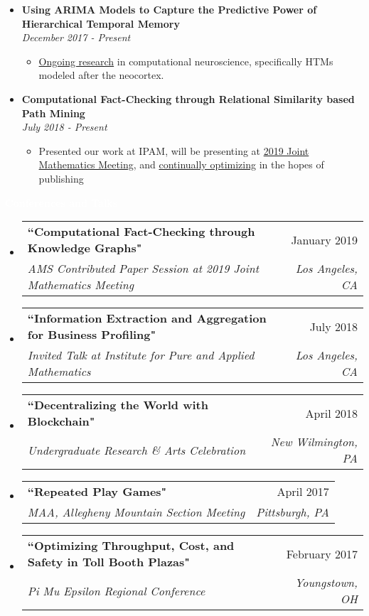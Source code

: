 \documentclass[letterpaper,11pt]{article}
\makeatletter
\newcommand{\resitem}[1]{\item #1 \vspace{-2pt}}
\newcommand{\resheading}[1]{{\large \colorbox{electricpurple}{\begin{minipage}{\textwidth}{\textbf{#1 \vphantom{p\^{E}}}}\end{minipage}}}}
\newcommand{\ressubheading}[4]{
	\begin{tabular*}{7.0in}{l@{\extracolsep{\fill}}r}
		\textbf{#1} & #2 \\
		\textit{#3} & \textit{#4} \\
	\end{tabular*}\vspace{-6pt}}
\makeatother
\begin{document}
		\begin{itemize}[topsep=3pt, itemsep=1pt]
			\item \textbf{Using ARIMA Models to Capture the Predictive Power of Hierarchical Temporal Memory} \\ \textit{December 2017 - Present}
			\begin{itemize}[topsep=1pt, itemsep=1pt]
				\resitem{\href{https://github.com/alexandermichels/HonorsResearch}{Ongoing research} in computational neuroscience, specifically HTMs modeled after the neocortex.}
			\end{itemize}
			
			\item \textbf{Computational Fact-Checking through Relational Similarity based Path Mining} \\	\textit{July 2018 - Present}
			\begin{itemize}[topsep=1pt, itemsep=1pt]
				\resitem{Presented our work at IPAM, will be presenting at \href{https://jointmathematicsmeetings.org/meetings/national/jmm2019/2217_progfull.html?fbclid=IwAR0AccnUi\_yuX4UdnTVF-cCFVJ5lNYAdIvzw7TPS81eGXk1pn5PvQjaGyTo\#2217:AMSCP33}{2019 Joint Mathematics Meeting}, and \href{https://github.com/himahuja/StreamMiner}{continually optimizing} in the hopes of publishing}
			\end{itemize}
		\end{itemize}
	
		\resheading{\textcolor{white}{Conferences and Talks}}
		
		\begin{itemize}[topsep=3pt, itemsep=1pt]
			\item
			\ressubheading{``Computational Fact-Checking through Knowledge Graphs"}{January 2019}{AMS Contributed Paper Session at 2019 Joint Mathematics Meeting}{Los Angeles, CA}
			\item
			\ressubheading{``Information Extraction and Aggregation for Business Profiling"}{July 2018}{Invited Talk at Institute for Pure and Applied Mathematics}{Los Angeles, CA}
			\item
			\ressubheading{``Decentralizing the World with Blockchain"}{April 2018}{Undergraduate Research \& Arts Celebration}{New Wilmington, PA}
			\item
			\ressubheading{``Repeated Play Games"}{April 2017}{MAA, Allegheny Mountain Section Meeting}{Pittsburgh, PA}
			\item
			\ressubheading{``Optimizing Throughput, Cost, and Safety in Toll Booth Plazas"}{February 2017}{Pi Mu Epsilon Regional Conference}{Youngstown, OH}
			
		\end{itemize}
	\pagebreak
	
\end{document}

